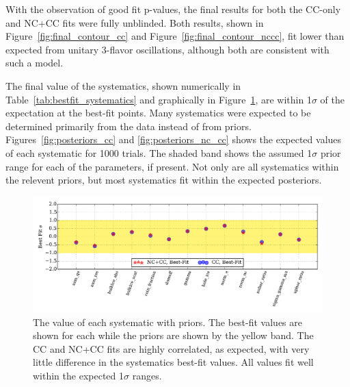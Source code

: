 With the observation of good fit p-values, the final results for both the CC-only and NC+CC fits were fully unblinded.
Both results, shown in Figure~\ref{fig:final_contour_cc} and Figure~\ref{fig:final_contour_nccc}, fit lower than expected from unitary 3-flavor oscillations, although both are consistent with such a model.

The final value of the systematics, shown numerically in Table~\ref{tab:bestfit_systematics} and graphically in Figure~\ref{fig:syst_pulls}, are within 1${\sigma}$ of the expectation at the best-fit points.
Many systematics were expected to be determined primarily from the data instead of from priors. 
Figures~\ref{fig:posteriors_cc} and \ref{fig:posteriors_nc_cc} shows the expected values of each systematic for 1000 trials.
The shaded band shows the assumed 1${\sigma}$ prior range for each of the parameters, if present.
Not only are all systematics within the relevent priors, but most systematics fit within the expected posteriors.

\begin{figure}{}
	\centering \includegraphics[width=\textwidth]{pulls.pdf}
	\caption{The value of each systematic with priors. The best-fit values are shown for each while the priors are shown by the yellow band. The CC and NC+CC fits are highly correlated, as expected, with very little difference in the systematics best-fit values. All values fit well within the expected 1$\sigma$ ranges.}
	\label{fig:syst_pulls}
\end{figure}

